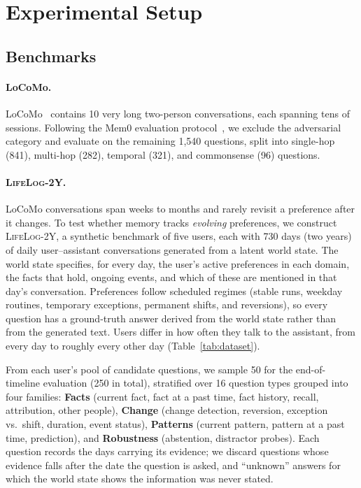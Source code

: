 \documentclass[11pt]{article}
\newcommand{\dataset}{\textsc{LifeLog-2Y}}
\begin{document}
\section{Experimental Setup}
\label{sec:setup}

\subsection{Benchmarks}

\paragraph{LoCoMo.}
LoCoMo~\citep{maharana2024locomo} contains 10 very long two-person conversations, each spanning tens of sessions. Following the Mem0 evaluation protocol~\citep{chhikara2025mem0}, we exclude the adversarial category and evaluate on the remaining 1{,}540 questions, split into single-hop (841), multi-hop (282), temporal (321), and commonsense (96) questions.

\paragraph{\dataset.}
LoCoMo conversations span weeks to months and rarely revisit a preference after it changes. To test whether memory tracks \emph{evolving} preferences, we construct \dataset{}, a synthetic benchmark of five users, each with 730 days (two years) of daily user--assistant conversations generated from a latent world state. The world state specifies, for every day, the user's active preferences in each domain, the facts that hold, ongoing events, and which of these are mentioned in that day's conversation. Preferences follow scheduled regimes (stable runs, weekday routines, temporary exceptions, permanent shifts, and reversions), so every question has a ground-truth answer derived from the world state rather than from the generated text. Users differ in how often they talk to the assistant, from every day to roughly every other day (Table~\ref{tab:dataset}).

From each user's pool of candidate questions, we sample 50 for the end-of-timeline evaluation (250 in total), stratified over 16 question types grouped into four families:
\textbf{Facts} (current fact, fact at a past time, fact history, recall, attribution, other people),
\textbf{Change} (change detection, reversion, exception vs.\ shift, duration, event status),
\textbf{Patterns} (current pattern, pattern at a past time, prediction), and
\textbf{Robustness} (abstention, distractor probes).
Each question records the days carrying its evidence; we discard questions whose evidence falls after the date the question is asked, and ``unknown'' answers for which the world state shows the information was never stated.
\end{document}
